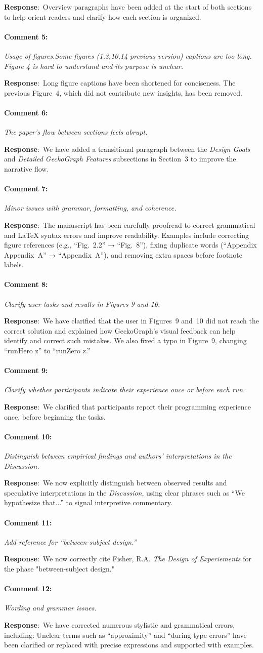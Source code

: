\documentclass{article}
\newcommand{\pointRaised}[2]{\medskip \noindent 
               \paragraph{#1} \textsl{#2}}
\newcommand{\reply}{\noindent \textbf{Response}:\ }
\begin{document}
\reply Overview paragraphs have been added at the start of both sections to help orient readers and clarify how each section is organized.

\pointRaised{Comment 5:}{Usage of figures.Some figures (1,3,10,14 previous version) captions are too long. Figure 4 is hard to understand and its purpose is unclear.}

\reply Long figure captions have been shortened for conciseness. The previous Figure~4, which did not contribute new insights, has been removed.

\pointRaised{Comment 6:}{The paper’s flow between sections feels abrupt.}

\reply We have added a transitional paragraph between the \textit{Design Goals} and \textit{Detailed GeckoGraph Features} subsections in Section~3 to improve the narrative flow.

\pointRaised{Comment 7:}{Minor issues with grammar, formatting, and coherence.}

\reply The manuscript has been carefully proofread to correct grammatical and LaTeX syntax errors and improve readability.  
Examples include correcting figure references (e.g., “Fig.~2.2” → “Fig.~8”), fixing duplicate words (“Appendix Appendix~A” → “Appendix~A”), and removing extra spaces before footnote labels.

\pointRaised{Comment 8:}{Clarify user tasks and results in Figures 9 and 10.}

\reply We have clarified that the user in Figures~9 and~10 did not reach the correct solution and explained how GeckoGraph’s visual feedback can help identify and correct such mistakes. We also fixed a typo in Figure~9, changing “runHero z” to “runZero z.”

\pointRaised{Comment 9:}{Clarify whether participants indicate their experience once or before each run.}

\reply We clarified that participants report their programming experience once, before beginning the tasks.

\pointRaised{Comment 10:}{Distinguish between empirical findings and authors’ interpretations in the Discussion.}

\reply We now explicitly distinguish between observed results and speculative interpretations in the \textit{Discussion}, using clear phrases such as “We hypothesize that...” to signal interpretive commentary.

\pointRaised{Comment 11:}{Add reference for “between-subject design.”}

\reply We now correctly cite Fisher, R.A. {\it The Design of Experiements} for the phase "between-subject design."


\pointRaised{Comment 12:}{Wording and grammar issues.}

\reply We have corrected numerous stylistic and grammatical errors, including:
Unclear terms such as “approximity” and “during type errors” have been clarified or replaced with precise expressions and supported with examples.  
\end{document}
